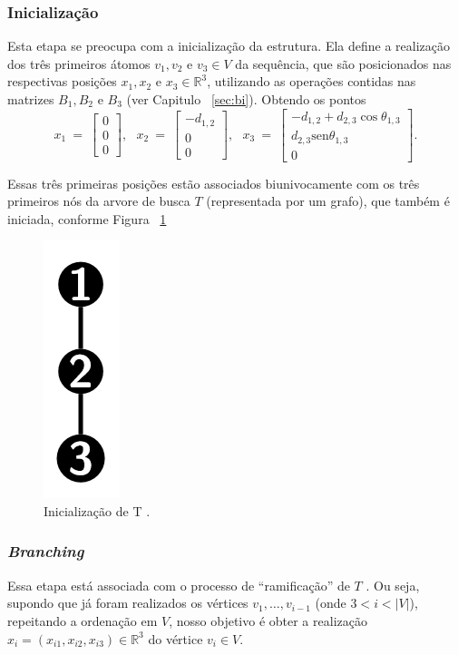 \documentclass[a4paper,12pt]{article}
\begin{document}
	\subsubsection*{Inicialização}
	Esta etapa se preocupa com a inicialização da estrutura. Ela define a realização dos três primeiros átomos $v_1, v_2$ e $v_3 \in V$ da sequência, que são posicionados nas respectivas posições $x_1, x_2$ e $x_3 \in \mathbb{R}^3$, utilizando as operações contidas nas matrizes $B_1, B_2$ e $B_3$ (ver Capitulo ~\ref{sec:bi}). Obtendo os pontos 	
	$$
	x_1\:=\:
	\begin{bmatrix}
	0\\ 
	0\\  
	0
	\end{bmatrix},\:\:\:
	x_2\:=\:
	\begin{bmatrix}
	-d_{1,2}\\ 
	0\\  
	0
	\end{bmatrix},\:\:\:
	x_3\:=\:
	\begin{bmatrix}
	-d_{1,2}+d_{2,3}\cos\theta_{1,3}\\ 
	d_{2,3}\mbox{sen}\theta_{1,3}\\  
	0
	\end{bmatrix}.
	$$
	
	Essas três primeiras posições estão associados biunivocamente com os três primeiros nós da arvore de busca $T$ (representada por um grafo), que também é iniciada, conforme Figura ~\ref{fig:bp1}
	
	\begin{figure}[H]
		\begin{center}
			\includegraphics[width=0.035\linewidth]{bp1.png}
		\end{center}
		\caption{Inicialização de T \cite{fidalgotese}.}
		\label{fig:bp1}
	\end{figure}
		
	\subsubsection*{\textit{Branching}}
	Essa etapa está associada com o processo de ``ramificação'' de $T$ \cite{fidalgotese}. Ou seja, supondo que já foram realizados os vértices $v_1, \dots, v_{i-1}$ (onde $3 < i< |V|$), repeitando a ordenação em $V$, nosso objetivo é obter a realização $x_i = (x_{i1}, x_{i2}, x_{i3}) \in \mathbb{R}^3$ do vértice $v_i \in V$.
	
\end{document}
